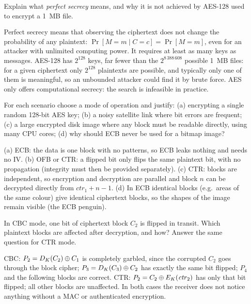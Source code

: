 \begin{exercise}
Explain what \emph{perfect secrecy} means, and why it is not achieved by AES-128 used to encrypt a 1~MB file.
\end{exercise}
\begin{solution}
Perfect secrecy means that observing the ciphertext does not change the probability of any plaintext: $\Pr[M=m \mid C=c] = \Pr[M=m]$, even for an attacker with unlimited computing power. It requires at least as many keys as messages. AES-128 has $2^{128}$ keys, far fewer than the $2^{8\,388\,608}$ possible 1~MB files: for a given ciphertext only $2^{128}$ plaintexts are possible, and typically only one of them is meaningful, so an unbounded attacker could find it by brute force. AES only offers computational secrecy: the search is infeasible in practice.
\end{solution}

\begin{exercise}
For each scenario choose a mode of operation and justify: (a) encrypting a single random 128-bit AES key; (b) a noisy satellite link where bit errors are frequent; (c) a large encrypted disk image where any block must be readable directly, using many CPU cores; (d) why should ECB never be used for a bitmap image?
\end{exercise}
\begin{solution}
(a) ECB: the data is one block with no patterns, so ECB leaks nothing and needs no IV. (b) OFB or CTR: a flipped bit only flips the same plaintext bit, with no propagation (integrity must then be provided separately). (c) CTR: blocks are independent, so encryption and decryption are parallel and block $n$ can be decrypted directly from $\mathit{ctr}_1 + n - 1$. (d) In ECB identical blocks (e.g.\ areas of the same colour) give identical ciphertext blocks, so the shapes of the image remain visible (the ECB penguin).
\end{solution}

\begin{exercise}
In CBC mode, one bit of ciphertext block $C_2$ is flipped in transit. Which plaintext blocks are affected after decryption, and how? Answer the same question for CTR mode.
\end{exercise}
\begin{solution}
CBC: $P_2 = D_K(C_2) \oplus C_1$ is completely garbled, since the corrupted $C_2$ goes through the block cipher; $P_3 = D_K(C_3) \oplus C_2$ has exactly the same bit flipped; $P_4$ and the following blocks are correct. CTR: $P_2 = C_2 \oplus E_K(\mathit{ctr}_2)$ has only that bit flipped; all other blocks are unaffected. In both cases the receiver does not notice anything without a MAC or authenticated encryption.
\end{solution}

